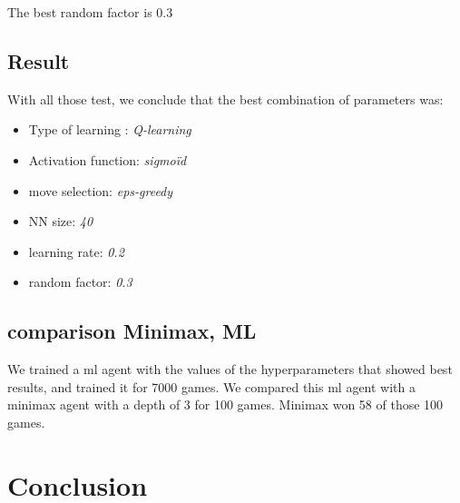 \documentclass{article}
\begin{document}
The best random factor is 0.3

\newline

\subsection{Result}
With all those test, we conclude that the best combination of parameters was:
\begin{itemize}
    \item Type of learning : \textit{ Q-learning}
    \item Activation function: \textit{sigmoïd}
    \item move selection: \textit{eps-greedy}
    \item NN size: \textit{40}
    \item learning rate: \textit{0.2}
    \item random factor: \textit{0.3}
\end{itemize}

\subsection{comparison Minimax, ML}
We trained a ml agent with the values of the hyperparameters that showed best results, and trained it for 7000 games. We compared this ml agent with a minimax agent with a depth of 3 for 100 games. Minimax won 58 of those 100 games.

\section{Conclusion}
\end{document}
